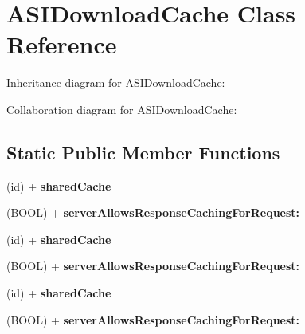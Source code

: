 \hypertarget{interface_a_s_i_download_cache}{
\section{\-A\-S\-I\-Download\-Cache \-Class \-Reference}
\label{interface_a_s_i_download_cache}
}


\-Inheritance diagram for \-A\-S\-I\-Download\-Cache\-:


\-Collaboration diagram for \-A\-S\-I\-Download\-Cache\-:
\subsection*{\-Static \-Public \-Member \-Functions}
\begin{DoxyCompactItemize}
\item 
\hypertarget{interface_a_s_i_download_cache_aa3f734926635c674880b0b626d3b10e6}{
(id) + {\bfseries shared\-Cache}}
\label{interface_a_s_i_download_cache_aa3f734926635c674880b0b626d3b10e6}

\item 
\hypertarget{interface_a_s_i_download_cache_a29ab27733d818070c22611c9cd38a338}{
(\-B\-O\-O\-L) + {\bfseries server\-Allows\-Response\-Caching\-For\-Request\-:}}
\label{interface_a_s_i_download_cache_a29ab27733d818070c22611c9cd38a338}

\item 
\hypertarget{interface_a_s_i_download_cache_aa3f734926635c674880b0b626d3b10e6}{
(id) + {\bfseries shared\-Cache}}
\label{interface_a_s_i_download_cache_aa3f734926635c674880b0b626d3b10e6}

\item 
\hypertarget{interface_a_s_i_download_cache_a29ab27733d818070c22611c9cd38a338}{
(\-B\-O\-O\-L) + {\bfseries server\-Allows\-Response\-Caching\-For\-Request\-:}}
\label{interface_a_s_i_download_cache_a29ab27733d818070c22611c9cd38a338}

\item 
\hypertarget{interface_a_s_i_download_cache_aa3f734926635c674880b0b626d3b10e6}{
(id) + {\bfseries shared\-Cache}}
\label{interface_a_s_i_download_cache_aa3f734926635c674880b0b626d3b10e6}

\item 
\hypertarget{interface_a_s_i_download_cache_a29ab27733d818070c22611c9cd38a338}{
(\-B\-O\-O\-L) + {\bfseries server\-Allows\-Response\-Caching\-For\-Request\-:}}
\label{interface_a_s_i_download_cache_a29ab27733d818070c22611c9cd38a338}


\end{DoxyCompactItemize}
